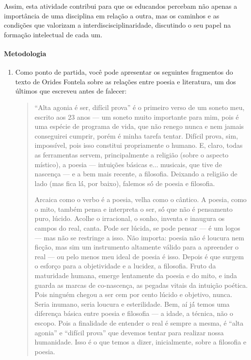 \documentclass[12pt]{extarticle}
\begin{document}
Assim, esta atividade contribui para que os educandos percebam não
apenas a importância de uma disciplina em relação a outra, mas os
caminhos e as condições que valorizam a interdiscisciplinaridade,
discutindo o seu papel na formação intelectual de cada um.

\paragraph{Metodologia} 

\begin{enumerate}
\item Como ponto de partida, você pode apresentar os
seguintes fragmentos do texto de Orides Fontela sobre as relações entre
poesia e literatura, um dos últimos que escreveu antes de falecer:

\begin{quote}
``Alta agonia é ser, difícil prova'' é o primeiro verso de um soneto
meu, escrito aos 23 anos --- um soneto muito importante para mim, pois é
uma espécie de programa de vida, que não renego nunca e nem jamais
conseguirei cumprir, porém é minha tarefa tentar. Difícil prova, sim,
impossível, pois isso constitui propriamente o humano. E, claro, todas
as ferramentas servem, principalmente a religião (sobre o aspecto
místico), a poesia --- intuições básicas e... musicais, que tive de
nascença --- e a bem mais recente, a filosofia. Deixando a religião de
lado (mas fica lá́, por baixo), falemos só́ de poesia e filosofia.

Arcaica como o verbo é a poesia, velha como o cântico. A poesia, como o
mito, também pensa e interpreta o ser, só́ que não é pensamento puro,
lúcido. Acolhe o irracional, o sonho, inventa e inaugura os campos do
real, canta. Pode ser lúcida, se pode pensar --- é um logos --- mas não
se restringe a isso. Não importa: poesia não é loucura nem ficção, mas
sim um instrumento altamente válido para a apreender o real --- ou pelo
menos meu ideal de poesia é isso. Depois é que surgem o esforço para a
objetividade e a lucidez, a filosofia. Fruto da maturidade humana,
emerge lentamente da poesia e do mito, e inda guarda as marcas de
co-nascença, as pegadas vitais da intuição poética. Pois ninguém chegou
a ser cem por cento lúcido e objetivo, nunca. Seria inumano, seria
loucura e esterilidade. Bem, aí já́ temos uma diferença básica entre
poesia e filosofia --- a idade, a técnica, não o escopo. Pois a
finalidade de entender o real é sempre a mesma, é ``alta agonia'' e
``difícil prova'' que devemos tentar para realizar nossa humanidade.
Isso é o que temos a dizer, inicialmente, sobre a filosofia e poesia.


\end{quote}
\end{enumerate}
\end{document}

